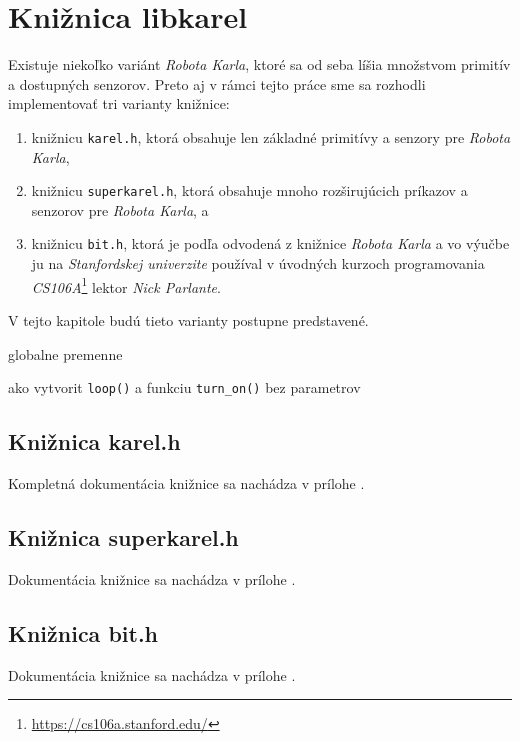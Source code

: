 
\chapter{Knižnica libkarel}\label{ch:libkarel}

Existuje niekoľko variánt \emph{Robota Karla}, ktoré sa od seba líšia množstvom primitív a dostupných senzorov. Preto aj v rámci tejto práce sme sa rozhodli implementovať tri varianty knižnice:

\begin{enumerate}
    \item knižnicu \texttt{karel.h}, ktorá obsahuje len základné primitívy a senzory pre \emph{Robota Karla},
    \item knižnicu \texttt{superkarel.h}, ktorá obsahuje mnoho rozširujúcich príkazov a senzorov pre \emph{Robota Karla}, a
    \item knižnicu \texttt{bit.h}, ktorá je podľa \cite{Gregg2021} odvodená z knižnice \emph{Robota Karla} a vo výučbe ju na \emph{Stanfordskej univerzite} používal v úvodných kurzoch programovania \emph{CS106A}\footnote{\url{https://cs106a.stanford.edu/}} lektor \emph{Nick Parlante}.
\end{enumerate}

V tejto kapitole budú tieto varianty postupne predstavené.


globalne premenne

ako vytvorit \texttt{loop()} a funkciu \texttt{turn\_on()} bez parametrov



\section{Knižnica karel.h}


Kompletná dokumentácia knižnice sa nachádza v prílohe .


\section{Knižnica superkarel.h}

Dokumentácia knižnice sa nachádza v prílohe .


\section{Knižnica bit.h}

Dokumentácia knižnice sa nachádza v prílohe .



